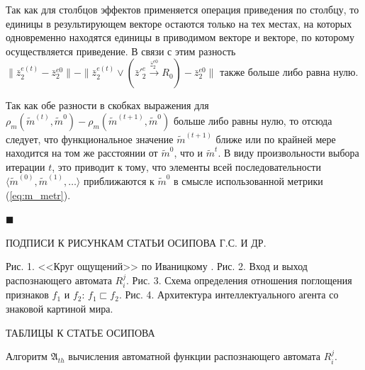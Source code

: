 \documentclass[a4paper, 12pt]{article}
\theoremstyle{break}
\newenvironment{Proof}%
	{\par\noindent{\bf Доказательство.}}%
	{\hfill$\scriptstyle\blacksquare$}
\newcommand{\stretchsize}{2}
\renewcommand{\baselinestretch}{\stretchsize}
\numberwithin{equation}{section}
\begin{document}
\begin{Proof}
		Так как для столбцов эффектов применяется операция приведения по столбцу, то единицы в результирующем векторе остаются только на тех местах, на которых одновременно находятся единицы в приводимом векторе и векторе, по которому осуществляется приведение. В связи с этим разность $\|\bar z_2^{e(t)}-\bar z_2^{e0}\|-\|\bar z_2^{e(t)}\vee (\bar z'^e_2\xrightarrow{\bar z_2^{e0}} R_0)-\bar z_2^{e0}\|$ также больше либо равна нулю.
		
		Так как обе разности в скобках выражения для $\rho_m(\tilde m^{(t)},\tilde m^0)-\rho_m(\tilde m^{(t+1)},\tilde m^0)$ больше либо равны нулю, то отсюда следует, что функциональное значение $\tilde m^{(t+1)}$ ближе или по крайней мере находится на том же расстоянии от $\tilde m^0$, что и $\tilde m^{t}$. В виду произвольности выбора итерации $t$, это приводит к тому, что элементы всей последовательности $\langle\tilde m^{(0)},\tilde m^{(1)},\dots\rangle$ приближаются к $\tilde m^0$ в смысле использованной метрики (\ref{eq:m_metr}). 
		
	\end{Proof}
	
	\newpage
	

	\newpage
	{\normalfont\centering\MakeUppercase{Подписи к рисункам статьи Осипова Г.С. и др.}\\}
	
	\noindent Рис. 1. <<Круг ощущений>> по Иваницкому \cite{Aleksandrov2007}.\newline
	Рис. 2. Вход и выход распознающего автомата $R_i^j$.\newline
	Рис. 3. Схема определения отношения поглощения признаков $f_1$ и $f_2$: $f_1\sqsubset f_2$.\newline
	Рис. 4. Архитектура интеллектуального агента со знаковой картиной мира.\newline

	\newpage
	{\normalfont\centering\MakeUppercase{Таблицы к статье Осипова}\\}
	
	\renewcommand{\baselinestretch}{1}
	\begin{algorithm}[h]
		\caption{Алгоритм $\mathfrak{A}_{th}$ вычисления автоматной функции распознающего автомата $R_i^j$.}\label{alg:automato}
		\begin{algorithmic}[1]
			
			
		\end{algorithmic}
	\end{algorithm}
\end{document}
